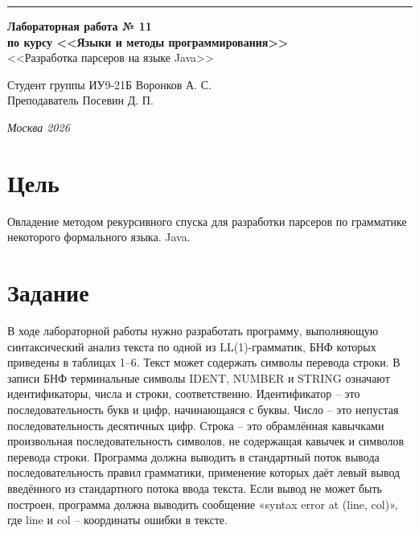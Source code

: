 \documentclass[a4paper, 14pt]{extarticle}
\begin{document}
\begin{titlepage}
\vspace*{-16pt}
\hspace{30pt}\rule{0.866\textwidth}{0.4pt}
  
\vspace{11em}

\begin{center}
\Large {\bf Лабораторная работа № 11} \\ 
\large {\bf по курсу <<Языки и методы программирования>>} \\ 
\large <<Разработка парсеров на языке Java>>
\end{center}\normalsize

\vspace{8em}


\begin{flushright}
  {Студент группы ИУ9-21Б Воронков А. С.\hspace*{15pt} \\
  \vspace{2ex}
  Преподаватель Посевин Д. П.\hspace*{15pt}}
\end{flushright}

\bigskip

\vfill
 

\begin{center}
\textsl{Москва 2026}
\end{center}
\end{titlepage}

\renewcommand{\ttdefault}{pcr}

\setlength{\tabcolsep}{3pt}
\newpage
\setcounter{page}{2}

\section{Цель}\label{Sect::task}
\par 
Овладение методом рекурсивного спуска для разработки парсеров по грамматике некоторого формального языка.
Java.    
\section{Задание}
В ходе лабораторной работы нужно разработать программу, выполняющую синтаксический анализ текста по одной из LL(1)-грамматик, БНФ которых приведены в таблицах 1–6. Текст может содержать символы перевода строки.
	В записи БНФ терминальные символы IDENT, NUMBER и STRING означают идентификаторы, числа и строки, соответственно. Идентификатор – это последовательность букв и цифр, начинающаяся с буквы. Число – это непустая последовательность десятичных цифр. Строка – это обрамлённая кавычками произвольная последовательность символов, не содержащая кавычек и символов перевода строки.
	Программа должна выводить в стандартный поток вывода последовательность правил
грамматики, применение которых даёт левый вывод введённого из стандартного потока ввода текста. Если вывод не может быть построен, программа должна выводить сообщение «syntax error at (line, col)», где line и col – координаты ошибки в тексте.
\end{document}
